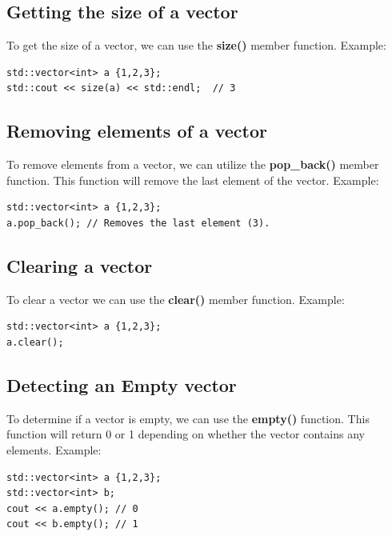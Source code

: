 \documentclass{report}
\begin{document}
    \bigbreak \noindent 
    \subsection{Getting the size of a vector}
    \bigbreak \noindent 
    To get the size of a vector, we can use the \textbf{size()} member function.
    \bigbreak \noindent 
    Example:
    \bigbreak \noindent 
    \sepline
    \begin{verbatim}
std::vector<int> a {1,2,3};
std::cout << size(a) << std::endl;  // 3
    \end{verbatim}
    \sepline

    \bigbreak \noindent 
    \subsection{Removing elements of a vector} 
    \bigbreak \noindent 
    To remove elements from a vector, we can utilize the \textbf{pop\_back()} member function. This function will remove the last element of the vector.
    \bigbreak \noindent 
    Example:
    \bigbreak \noindent 
    \sepline
    \begin{verbatim}
std::vector<int> a {1,2,3};
a.pop_back(); // Removes the last element (3).
    \end{verbatim}
    \sepline

    \bigbreak \noindent 
    \subsection{Clearing a vector}
    \bigbreak \noindent 
    To clear a vector we can use the \textbf{clear()} member function.
    \bigbreak \noindent 
    Example:
    \bigbreak \noindent 
    \sepline
    \begin{verbatim}
std::vector<int> a {1,2,3};
a.clear();
    \end{verbatim}
    \sepline

    \bigbreak \noindent 
    \subsection{Detecting an Empty vector}
    \bigbreak \noindent 
    To determine if a vector is empty, we can use the \textbf{empty()} function. This function will return 0 or 1 depending on whether the vector contains any elements.
    \bigbreak \noindent 
    Example:
    \bigbreak \noindent 
    \sepline
    \begin{verbatim}
std::vector<int> a {1,2,3};
std::vector<int> b;
cout << a.empty(); // 0
cout << b.empty(); // 1
    \end{verbatim}
    \sepline
\end{document}
